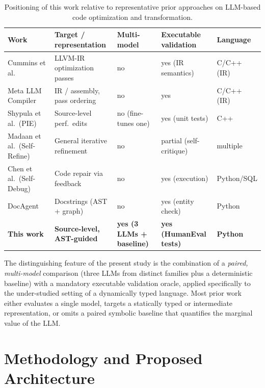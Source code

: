 \documentclass[conference]{IEEEtran}
\begin{document}
\begin{table}[htbp]
\caption{Positioning of this work relative to representative prior approaches on LLM-based code optimization and transformation.}
\label{tab:related}
\centering
\footnotesize
\begin{tabular}{lllll}
\hline
\textbf{Work} & \textbf{Target / representation} & \textbf{Multi-model} & \textbf{Executable validation} & \textbf{Language} \\
\hline
Cummins et al.~\cite{DBLP:journals/corr/abs-2309-07062} & LLVM-IR optimization passes & no & yes (IR semantics) & C/C++ (IR) \\
Meta LLM Compiler~\cite{DBLP:journals/corr/abs-2407-02524} & IR / assembly, pass ordering & no & yes & C/C++ (IR) \\
Shypula et al.\ (PIE)~\cite{DBLP:journals/corr/abs-2302-07867} & Source-level perf.\ edits & no (fine-tunes one) & yes (unit tests) & C++ \\
Madaan et al.\ (Self-Refine)~\cite{DBLP:journals/corr/abs-2303-17651} & General iterative refinement & no & partial (self-critique) & multiple \\
Chen et al.\ (Self-Debug)~\cite{DBLP:journals/corr/abs-2304-05128} & Code repair via feedback & no & yes (execution) & Python/SQL \\
DocAgent~\cite{DBLP:journals/corr/abs-2504-08725} & Docstrings (AST + graph) & no & yes (entity check) & Python \\
\hline
\textbf{This work} & \textbf{Source-level, AST-guided} & \textbf{yes (3 LLMs + baseline)} & \textbf{yes (HumanEval tests)} & \textbf{Python} \\
\hline
\end{tabular}
\end{table}

The distinguishing feature of the present study is the combination of a \emph{paired, multi-model} comparison (three LLMs from distinct families plus a deterministic baseline) with a mandatory executable validation oracle, applied specifically to the under-studied setting of a dynamically typed language. Most prior work either evaluates a single model, targets a statically typed or intermediate representation, or omits a paired symbolic baseline that quantifies the marginal value of the LLM.

\section{Methodology and Proposed Architecture}
\label{sec:metodologia}
\end{document}
